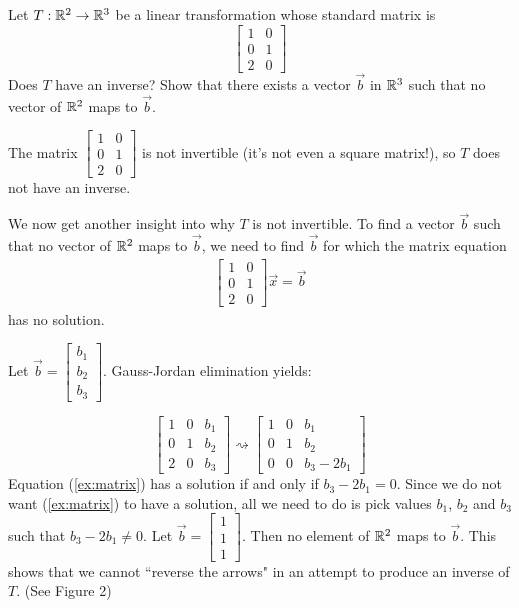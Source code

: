 \documentclass{ximera}
\begin{document}
\begin{example}\label{ex:notonto} Let $T:\mathbb{R}^2\rightarrow \mathbb{R}^3$ be a linear transformation whose standard matrix is
$$\begin{bmatrix}1&0\\0&1\\2&0\end{bmatrix}$$
Does $T$ have an inverse? Show that there exists a vector $\vec{b}$ in $\mathbb{R}^3$ such that no vector of $\mathbb{R}^2$ maps to $\vec{b}$. 
\begin{explanation}
The matrix $\begin{bmatrix}1&0\\0&1\\2&0\end{bmatrix}$ is not invertible (it's not even a square matrix!), so $T$ does not have an inverse.

We now get another insight into why $T$ is not invertible.
To find a vector $\vec{b}$ such that no vector of $\mathbb{R}^2$ maps to $\vec{b}$, we need to find $\vec{b}$ for which the matrix equation
\begin{align}\label{ex:matrix}\begin{bmatrix}1&0\\0&1\\2&0\end{bmatrix}\vec{x}=\vec{b}\end{align}
has no solution.  

Let $\vec{b}=\begin{bmatrix}b_1\\b_2\\b_3\end{bmatrix}$.  Gauss-Jordan elimination yields:

$$\left[\begin{array}{cc|c}  
 1 & 0 & b_1\\  
 0 & 1 & b_2\\
 2 & 0 & b_3
\end{array}\right] \rightsquigarrow \left[\begin{array}{cc|c} 
 1 & 0 & b_1\\  
 0 & 1 & b_2\\
 0 & 0 & b_3-2b_1
\end{array}\right]$$
Equation (\ref{ex:matrix}) has a solution if and only if $b_3-2b_1=0$.  Since we do not want (\ref{ex:matrix}) to have a solution, all we need to do is pick values $b_1$, $b_2$ and $b_3$ such that $b_3-2b_1\neq 0$.  Let $\vec{b}=\begin{bmatrix}1\\1\\1\end{bmatrix}$.  Then no element of $\mathbb{R}^2$ maps to $\vec{b}$.  This shows that we cannot ``reverse the arrows" in an attempt to produce an inverse of $T$. (See Figure 2)
\end{explanation}
\end{example}
\end{document}
